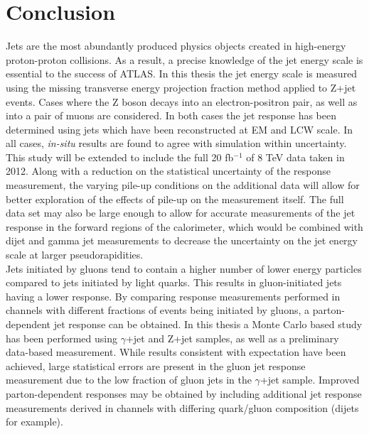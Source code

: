 \chapter{Conclusion}
Jets are the most abundantly produced physics objects created in high-energy proton-proton collisions.  
As a result, a precise knowledge of the jet energy scale is essential to the success of ATLAS.  
In this thesis the jet energy scale is measured using the missing transverse energy projection fraction method applied to Z+jet events.  
Cases where the Z boson decays into an electron-positron pair, as well as into a pair of muons are considered.  
In both cases the jet response has been determined using jets which have been reconstructed at EM and LCW scale.  
In all cases, \emph{in-situ} results are found to agree with simulation within uncertainty.  \\

This study will be extended to include the full 20 fb$^{-1}$ of 8 TeV data taken in 2012.  
Along with a reduction on the statistical uncertainty of the response measurement, the varying pile-up conditions on the additional data will allow for better exploration of the effects of pile-up on the measurement itself.  
The full data set may also be large enough to allow for accurate measurements of the jet response in the forward regions of the calorimeter, which would be combined with dijet and gamma jet measurements to decrease the uncertainty on the jet energy scale at larger pseudorapidities.  \\

Jets initiated by gluons tend to contain a higher number of lower energy particles compared to jets initiated by light quarks.  
This results in gluon-initiated jets having a lower response.  
By comparing response measurements performed in channels with different fractions of events being initiated by gluons, a parton-dependent jet response can be obtained.  
In this thesis a Monte Carlo based study has been performed using $\gamma$+jet and Z+jet samples, as well as a preliminary data-based measurement.  
While results consistent with expectation have been achieved, large statistical errors are present in the gluon jet response measurement due to the low fraction of gluon jets in the $\gamma$+jet sample.  
Improved parton-dependent responses may be obtained by including additional jet response measurements derived in channels with differing quark/gluon composition (dijets for example).   




